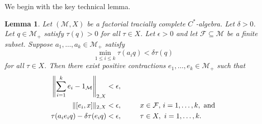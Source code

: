 \documentclass[a4paper,11pt]{amsart}
\newtheorem{lemma}[theorem]{Lemma}
\theoremstyle{definition}
\numberwithin{equation}{section}
\numberwithin{theorem}{section}
\newcommand{\F}{\mathcal F}
\newcommand{\M}{\mathcal{M}}
\begin{document}
We begin with the key technical lemma.
\begin{lemma}\label{lemma:weak-cpou}
    Let $(\M,X)$ be a factorial tracially complete $C^*$-algebra. 
    Let $\delta > 0$.
    Let $q \in \M_+$ satisfy $\tau(q) > 0$ for all $\tau \in X$.
    Let $\epsilon > 0$ and let $\F \subseteq \M$ be a finite subset.
    Suppose $a_1,\ldots,a_k \in \M_+$ satisfy 
    \begin{equation}
		\min_{1 \leq i \leq k} \tau(a_i q) < \delta \tau(q)
    \end{equation}
    for all $\tau \in X$.
    Then there exist positive contractions $e_1,\ldots,e_k \in \M_+$ such that
    \begin{alignat}{2}
		\left\|\sum_{i=1}^k e_i - 1_\M\right\|_{2,X} &< \epsilon,  && \label{eq:lemma-weak-cpou-statement-1}\\
        \|[e_i,x]\|_{2,X} &<\epsilon, &&x \in \F, \, i = 1, \ldots, k,\ \text{and}  \label{eq:lemma-weak-cpou-statement-2}\\
		\tau(a_i e_i q) - \delta \tau(e_i q) &< \epsilon, & \hspace{4ex}& \tau \in X,\ i = 1, \ldots, k. \label{eq:lemma-weak-cpou-statement-3}
    \end{alignat}
\end{lemma}
\end{document}
